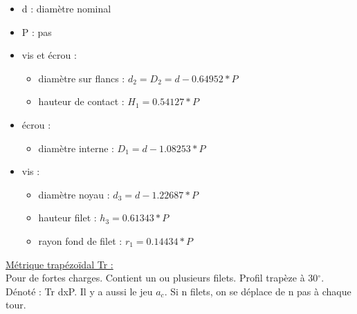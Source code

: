 \documentclass[../main.tex]{subfiles}
\begin{document}
\begin{itemize}
    \item d : diamètre nominal\\
    \item P : pas\\
    \item vis et écrou : \begin{itemize}
        \item diamètre sur flancs : $d_2 = D_2 = d-0.64952*P$\\
        \item hauteur de contact : $H_1 = 0.54127*P$\\
    \end{itemize}
    \item écrou : \begin{itemize}
        \item diamètre interne : $D_1 = d-1.08253*P$\\
    \end{itemize}
    \item vis : \begin{itemize}
        \item diamètre noyau : $d_3 = d-1.22687*P$\\
        \item hauteur filet : $h_3 = 0.61343*P$\\
        \item rayon fond de filet : $r_1 = 0.14434*P$\\
    \end{itemize}
\end{itemize}

\quad \underline{Métrique trapézoïdal Tr :}\\
Pour de fortes charges. Contient un ou plusieurs filets. Profil trapèze à 30$^{\circ}$. \\
Dénoté : Tr dxP. Il y a aussi le jeu $a_c$. Si n filets, on se déplace de n pas à chaque tour.\\
\end{document}
